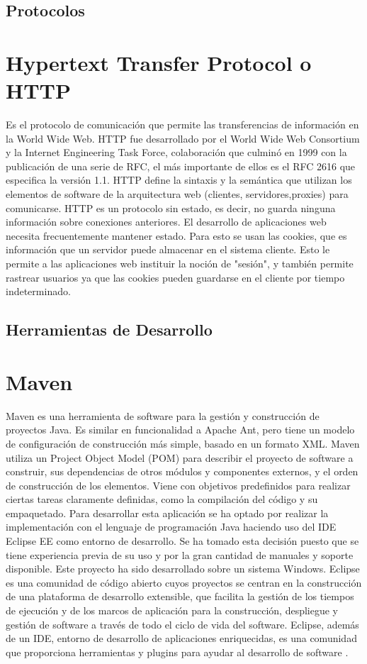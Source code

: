 \documentclass[12pt, a4paper, twoside]{book}
\begin{document}
	\subsection{Protocolos}
	\section{Hypertext Transfer Protocol o HTTP}
	Es el protocolo de comunicación que permite las transferencias de información en la World Wide Web. HTTP fue desarrollado por el World Wide Web Consortium y la Internet Engineering Task Force, colaboración que culminó en 1999 con la publicación de una serie de RFC, el más importante de ellos es el RFC 2616 que especifica la versión 1.1. HTTP define la sintaxis y la semántica que utilizan los elementos de software de la arquitectura web (clientes, servidores,proxies) para comunicarse. HTTP es un protocolo sin estado, es decir, no guarda ninguna información sobre conexiones anteriores. El desarrollo de aplicaciones web necesita frecuentemente mantener estado. Para esto se usan las cookies, que es información que un servidor puede almacenar en el sistema cliente. Esto le permite a las aplicaciones web instituir la noción de "sesión", y también permite rastrear usuarios ya que las cookies pueden guardarse en el cliente por tiempo indeterminado.
	\subsection{Herramientas de Desarrollo}
	\section{Maven}
	Maven es una herramienta de software para la gestión y construcción de
	proyectos Java. Es similar en funcionalidad a Apache Ant, pero tiene un modelo
	de configuración de construcción más simple, basado en un formato XML.
	Maven utiliza un Project Object Model (POM) para describir el proyecto de
	software a construir, sus dependencias de otros módulos y componentes externos,
	y el orden de construcción de los elementos. Viene con objetivos predefinidos para
	realizar ciertas tareas claramente definidas, como la compilación del código y su
	empaquetado.
	Para desarrollar esta aplicación se ha optado por realizar la implementación con el lenguaje de programación Java haciendo uso del IDE Eclipse EE como entorno de desarrollo. Se ha tomado esta decisión puesto que se tiene experiencia previa de su uso y por la gran cantidad de manuales y soporte disponible. Este proyecto ha sido desarrollado sobre un sistema Windows.
	Eclipse es una comunidad de código abierto cuyos proyectos se centran en la construcción de una plataforma de desarrollo extensible, que facilita la gestión de los tiempos de ejecución y de los marcos de aplicación para la construcción, despliegue y gestión de software a través de todo el ciclo de vida del software. Eclipse, además de un IDE, entorno de desarrollo de aplicaciones enriquecidas, es una comunidad que proporciona herramientas y plugins para ayudar al desarrollo de software \cite{Maven}.
\end{document}
